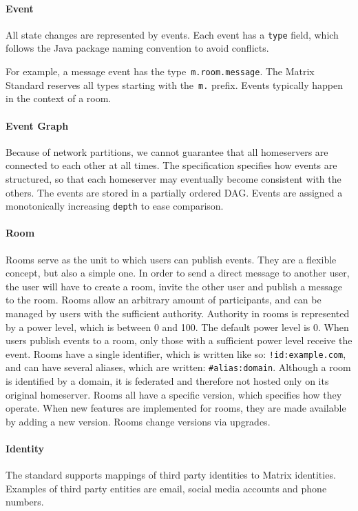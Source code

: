 \paragraph{Event}
All state changes are represented by events.
Each event has a \texttt{type} field, which follows the Java package naming convention to avoid conflicts.

For example, a message event has the type~\texttt{m.room.message}.
The Matrix Standard reserves all types starting with the~\texttt{m.} prefix.
Events typically happen in the context of a room.

\paragraph{Event Graph}
Because of network partitions, we cannot guarantee that all homeservers are connected to each other at all times.
The specification specifies how events are structured, so that each homeserver may eventually become consistent with the others.
The events are stored in a partially ordered \ac{DAG}.
Events are assigned a monotonically increasing \texttt{depth} to ease comparison.

\paragraph{Room}
Rooms serve as the unit to which users can publish events.
They are a flexible concept, but also a simple one.
In order to send a direct message to another user, the user will have to create a room, invite the other user and publish a message to the room.
Rooms allow an arbitrary amount of participants, and can be managed by users with the sufficient authority.
Authority in rooms is represented by a power level, which is between 0 and 100.
The default power level is 0.
When users publish events to a room, only those with a sufficient power level receive the event.
Rooms have a single identifier, which is written like so: \texttt{!id:example.com}, and can have several aliases, which are written: \texttt{\#alias:domain}.
Although a room is identified by a domain, it is federated and therefore not hosted only on its original homeserver.
Rooms all have a specific version, which specifies how they operate.
When new features are implemented for rooms, they are made available by adding a new version.
Rooms change versions via upgrades.

\paragraph{Identity}
The standard supports mappings of third party identities to Matrix identities.
Examples of third party entities are email, social media accounts and phone numbers.

